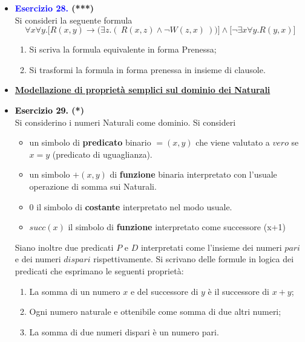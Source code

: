 \documentclass[a4paper,10pt]{article}
\begin{document}
{\begin{itemize}[label=, leftmargin=0pt]
    
    \item \textbf{\textcolor{blue}{Esercizio 28.} (***)} \\ 
    Si consideri la seguente formula 
    $$\forall x\forall y.\bigg[ R(x,y)\rightarrow\bigg(\exists z.(\ R(x,z) \land \lnot W (z,x)\ ) \bigg) \bigg] \land \bigg[ \lnot\exists x\forall y.R(y,x)\bigg]$$
    \begin{enumerate}
        \item Si scriva la formula equivalente in forma Prenessa;
        \item Si trasformi la formula in forma prenessa in insieme di clausole.\\[0.1cm]
    \end{enumerate}
    
    \item \textbf{\underline{Modellazione di proprietà semplici sul dominio dei Naturali}}



    \item \textbf{\textcolor{black}{Esercizio 29.} (*)}\\ 	
    Si considerino i numeri Naturali come dominio. Si consideri
    \begin{itemize}
        \item un simbolo di \textbf{predicato} binario $= (x, y)$ che viene valutato a $vero$ se $x = y$ (predicato di uguaglianza).
        \item un simbolo $+(x, y)$ di \textbf{funzione} binaria interpretato con l'usuale operazione di somma sui Naturali.
        \item $0$ il simbolo di \textbf{costante} interpretato nel modo usuale.
        \item $succ(x)$ il simbolo di \textbf{funzione} interpretato come successore (x+1)
    \end{itemize}
    Siano inoltre due predicati $P$ e $D$ interpretati come l'insieme dei numeri $pari$ e dei numeri $dispari$ rispettivamente. Si scrivano delle formule in logica dei predicati che esprimano le seguenti proprietà:
    \begin{enumerate}
        \item La somma di un numero $x$ e del successore di $y$ è il successore di $x+y$;
        \item Ogni numero naturale e ottenibile come somma di due altri numeri;
        \item La somma di due numeri dispari è un numero pari.\\[0.1cm]
    \end{enumerate}


\end{itemize}}
\end{document}
